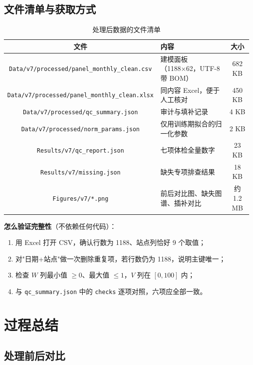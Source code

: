 \documentclass[11pt,a4paper]{ctexart}
\begin{document}
\subsection{文件清单与获取方式}

\begin{table}[H]\centering\small
\begin{tabularx}{\textwidth}{|c|X|c|}
\toprule
文件 & 内容 & 大小 \\
\midrule
\texttt{Data/v7/processed/panel\_monthly\_clean.csv} & 建模面板（1188×62，UTF-8 带 BOM） & 682 KB \\
\texttt{Data/v7/processed/panel\_monthly\_clean.xlsx} & 同内容 Excel，便于人工核对 & 450 KB \\
\texttt{Data/v7/processed/qc\_summary.json} & 审计与填补记录 & 4 KB \\
\texttt{Data/v7/processed/norm\_params.json} & 仅用训练期拟合的归一化参数 & 2 KB \\
\texttt{Results/v7/qc\_report.json} & 七项体检全量数字 & 23 KB \\
\texttt{Results/v7/missing.json} & 缺失专项排查结果 & 18 KB \\
\texttt{Figures/v7/*.png} & 前后对比图、缺失图谱、插补对比 & 约 1.2 MB \\
\bottomrule
\end{tabularx}
\caption{处理后数据的文件清单}
\end{table}

\noindent\textbf{怎么验证完整性}（不依赖任何代码）：
\begin{enumerate}
\item 用 Excel 打开 CSV，确认行数为 1188、站点列恰好 9 个取值；
\item 对"日期+站点"做一次删除重复项，若行数仍为 1188，说明主键唯一；
\item 检查 $W$ 列最小值 $\ge0$、最大值 $\le1$，$V$ 列在 $[0,100]$ 内；
\item 与 \texttt{qc\_summary.json} 中的 \texttt{checks} 逐项对照，六项应全部一致。
\end{enumerate}

\section{过程总结}

\subsection{处理前后对比}
\end{document}
